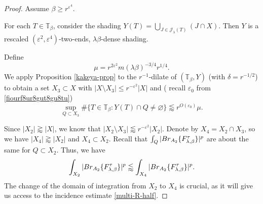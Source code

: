 \documentclass[10pt,a4paper]{amsart}
\newcommand{\Br}{{\rm{Br}}}
\newcommand{\ZT}{\mathbb{T}}
\newcommand{\be}{\beta}
\newcommand{\cj}{\mathcal J}
\newcommand{\e}{\varepsilon}
\newcommand{\la}{\lambda}
\begin{document}
\begin{proof}
	\medskip
	
	 Assume $\be\ge r^{\e^4}$.
    
	For each $T\in\ZT_{\be}$, consider the shading $Y(T)=\bigcup_{J\in\cj_\la(T)}(J\cap X)$.
	Then $Y$ is a rescaled $(\e^2, \e^{4})$-two-ends, $\la\be$-dense shading.
	
	
	\smallskip
	
	
	
	
	Define
	\begin{equation}
		\nonumber
		\mu=r^{2\e^{2}}m(\la\be)^{-3/4}r^{1/4}.
	\end{equation}
	We  apply Proposition \ref{kakeya-prop} to the $r^{-1}$-dilate of $(\ZT_\be, Y)$ (with $\delta=r^{-1/2}$) to obtain a set $X_3\subset X$ with
	 $|X\setminus X_3|\leq r^{-\e^2}|X|$ and ( recall $\e_0$ from \eqref{fiourf8ur8gut8gu8tu})
    \begin{equation}
		\label{multi-R-half}
		\sup_{Q\subset X_3}\#\{T\in\ZT_\be:Y(T)\cap Q\not=\varnothing\}\lessapprox r^{O(\e_0)}\mu.
	\end{equation}
	
	Since $|X_2|\gtrapprox |X|$, we know that  $|X_2\setminus X_3|\lessapprox r^{-\e^2}|X_2|$. 
	Denote by $X_4=X_2\cap X_3$, so we have $|X_4|\gtrapprox|X_2|$ and $X_4\subset X_2$. 
	Recall that $\int_{Q}|\Br_{A_2} \{F_{\lambda,\beta}^{\tau}\}|^p$
     are about the same for $Q\subset X_2$.
	Thus,  we have 
	\begin{equation}
		\label{bdbhdbvhhvbfdhvbhfb}\int_{X_2}|\Br_{A_2} \{F_{\lambda,\beta}^{\tau}\}|^p
		\lessapprox \int_{X_4}|\Br_{A_2} \{F_{\lambda,\beta}^{\tau}\}|^p.
	\end{equation}
    The change of the domain of integration from $X_2$ to $X_4$ is crucial, as it will give us access to the incidence estimate \eqref{multi-R-half}.
    

\end{proof}
\end{document}
